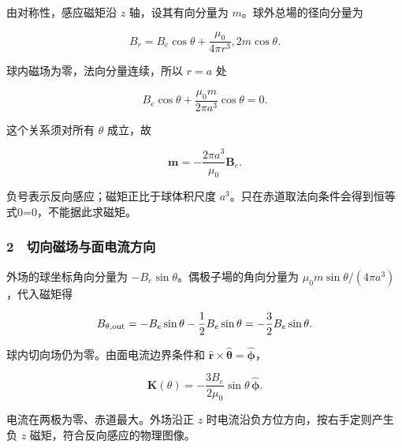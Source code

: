 \documentclass[12pt,a4paper,fontset=fandol]{ctexart}
\begin{document}
由对称性，感应磁矩沿 \(z\) 轴，设其有向分量为
\(m\)。球外总場的径向分量为

\[B_r=B_e\cos\theta+\frac{\mu_0}{4\pi r^3},2m\cos\theta.\]

球内磁场为零，法向分量连续，所以 \(r=a\) 处

\[B_e\cos\theta+\frac{\mu_0m}{2\pi a^3}\cos\theta=0.\]

这个关系须对所有 \(\theta\) 成立，故

\[\boxed{\boldsymbol m=-\frac{2\pi a^3}{\mu_0}\boldsymbol B_e.}\]

负号表示反向感应；磁矩正比于球体积尺度
\(a^3\)。只在赤道取法向条件会得到恒等式0=0，不能据此求磁矩。

\subsubsection{2　切向磁场与面电流方向}\label{ux5207ux5411ux78c1ux573aux4e0eux9762ux7535ux6d41ux65b9ux5411}

外场的球坐标角向分量为 \(-B_e\sin\theta\)。偶极子場的角向分量为
\(\mu_0m\sin\theta/(4\pi a^3)\)，代入磁矩得

\[B_{\theta,\rm out}=-B_e\sin\theta-\frac12B_e\sin\theta
=-\frac32B_e\sin\theta.\]

球内切向场仍为零。由面电流边界条件和
\(\hat{\boldsymbol r}\times\hat{\boldsymbol\theta}=\hat{\boldsymbol\phi}\)，

\[\boxed{\boldsymbol K(\theta)
=-\frac{3B_e}{2\mu_0}\sin\theta\,\hat{\boldsymbol\phi}.}\]

电流在两极为零、赤道最大。外场沿正 \(z\)
时电流沿负方位方向，按右手定则产生负 \(z\)
磁矩，符合反向感应的物理图像。

\begin{center}
\begin{minipage}{\linewidth}
\centering\begingroup{}
\ifdim\wd\diagrambox>.88\linewidth
\sbox{\diagrambox}{\resizebox{.88\linewidth}{!}{\usebox{\diagrambox}}}\fi
\ifdim\ht\diagrambox>.38\textheight
\resizebox{!}{.38\textheight}{\usebox{\diagrambox}}
\else\usebox{\diagrambox}\fi
\par{}\endgroup\end{minipage}\end{center}
\end{document}
